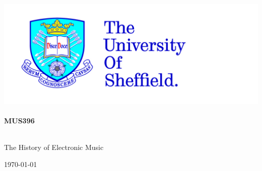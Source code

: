 
\begin{titlepage}

\begin{center}



\includegraphics[scale=0.2]{tuoslogo_cmyk_hi} \\




\HRule \\[0.4cm]
{ \huge \bfseries MUS396}\\[0.4cm]

\HRule \\[1.5cm]

\begin{minipage}{0.6\textwidth}
\begin{flushleft} \large
The History of Electronic Music\\
\end{flushleft}
\end{minipage}

\vfill

{\large \today}

\end{center}

\end{titlepage}
